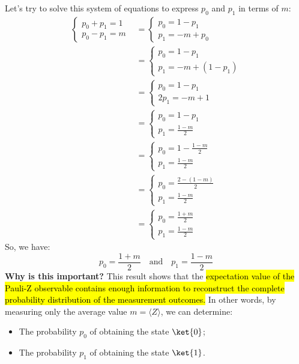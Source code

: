 \newpage

\noindent
Let's try to solve this system of equations to express $p_0$ and $p_1$ in terms of $m$:
\begin{align*}
    \begin{cases}
        p_0 + p_1 = 1 \\
        p_0 - p_1 = m
    \end{cases}
    &=
    \begin{cases}
        p_0 = 1 - p_1 \\
        p_1 = - m + p_0
    \end{cases} \\
    &=
    \begin{cases}
        p_0 = 1 - p_1 \\
        p_1 = - m + (1 - p_1)
    \end{cases} \\
    &=
    \begin{cases}
        p_0 = 1 - p_1 \\
        2p_1 = - m + 1
    \end{cases} \\
    &=
    \begin{cases}
        p_0 = 1 - p_1 \\
        p_1 = \frac{1 - m}{2}
    \end{cases} \\
    &=
    \begin{cases}
        p_0 = 1 - \frac{1 - m}{2} \\
        p_1 = \frac{1 - m}{2}
    \end{cases} \\
    &=
    \begin{cases}
        p_0 = \frac{2 - (1 - m)}{2} \\
        p_1 = \frac{1 - m}{2}
    \end{cases} \\
    &=
    \begin{cases}
        p_0 = \frac{1 + m}{2} \\
        p_1 = \frac{1 - m}{2}
    \end{cases}
\end{align*}
So, we have:
\begin{equation}\label{eq:probabilities-from-expectation}
    p_0
    =
    \frac{1 + m}{2}
    \quad\text{and}\quad
    p_1
    =
    \frac{1 - m}{2}
\end{equation}
\textcolor{Green3}{ \textbf{Why is this important?}} This result shows that the \hl{expectation value of the Pauli-Z observable contains enough information to reconstruct the complete probability distribution of the measurement outcomes.} In other words, by measuring only the average value $m = \langle Z \rangle$, we can determine:
\begin{itemize}
    \item The probability $p_0$ of obtaining the state $\ket{0}$;
    \item The probability $p_1$ of obtaining the state $\ket{1}$.
\end{itemize}

